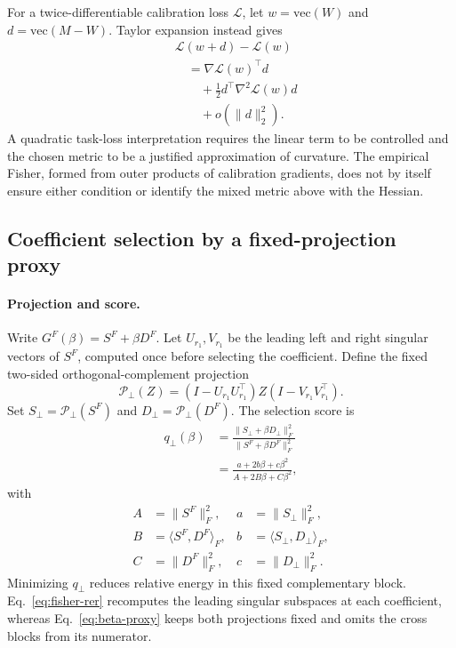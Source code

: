 For a twice-differentiable calibration loss $\mathcal L$, let $w=\mathrm{vec}(W)$ and $d=\mathrm{vec}(M-W)$. Taylor expansion instead gives
\begin{equation}
\begin{aligned}
&\mathcal L(w+d)-\mathcal L(w)\\
&\quad=\nabla\mathcal L(w)^\top d \\
&\qquad+\tfrac12 d^\top\nabla^2\mathcal L(w)d\\
&\qquad+o(\|d\|_2^2).
\end{aligned}
\end{equation}
A quadratic task-loss interpretation requires the linear term to be controlled and the chosen metric to be a justified approximation of curvature. The empirical Fisher, formed from outer products of calibration gradients, does not by itself ensure either condition or identify the mixed metric above with the Hessian.



\subsection{Coefficient selection by a fixed-projection proxy}\label{sup:beta-proxy}

\paragraph{Projection and score.}
Write $G^F(\beta)=S^F+\beta D^F$. Let $U_{r_1},V_{r_1}$ be the leading left and right singular vectors of $S^F$, computed once before selecting the coefficient. Define the fixed two-sided orthogonal-complement projection
\begin{equation}
\mathcal P_\perp(Z)=(I-U_{r_1}U_{r_1}^\top)Z
(I-V_{r_1}V_{r_1}^\top).
\label{eq:beta-projection}
\end{equation}
Set $S_\perp=\mathcal P_\perp(S^F)$ and $D_\perp=\mathcal P_\perp(D^F)$. The selection score is
\begin{equation}
\begin{aligned}
q_\perp(\beta)
&=\frac{\|S_\perp+\beta D_\perp\|_F^2}
{\|S^F+\beta D^F\|_F^2}\\
&=\frac{a+2b\beta+c\beta^2}{A+2B\beta+C\beta^2},
\end{aligned}
\label{eq:beta-proxy}
\end{equation}
with
\begin{equation}
\begin{aligned}
A&=\|S^F\|_F^2,& a&=\|S_\perp\|_F^2,\\
B&=\langle S^F,D^F\rangle_F,& b&=\langle S_\perp,D_\perp\rangle_F,\\
C&=\|D^F\|_F^2,& c&=\|D_\perp\|_F^2.
\end{aligned}
\label{eq:beta-coefficients}
\end{equation}
Minimizing $q_\perp$ reduces relative energy in this fixed complementary block. Eq.~\eqref{eq:fisher-rer} recomputes the leading singular subspaces at each coefficient, whereas Eq.~\eqref{eq:beta-proxy} keeps both projections fixed and omits the cross blocks from its numerator.

